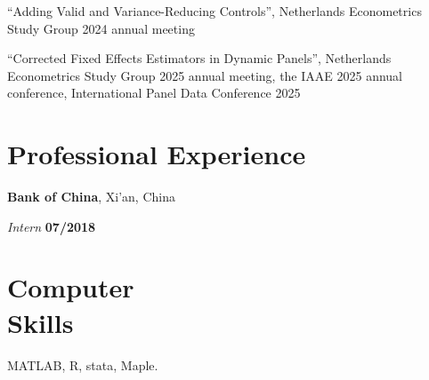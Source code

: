 \documentclass[margin,line]{res}
\newenvironment{list1}{
  \begin{list}{\ding{113}}{%
      \setlength{\itemsep}{0in}
      \setlength{\parsep}{0in} \setlength{\parskip}{0in}
      \setlength{\topsep}{0in} \setlength{\partopsep}{0in} 
      \setlength{\leftmargin}{0.17in}}}{\end{list}}
\begin{document}
\begin{resume}
``Adding Valid and Variance-Reducing Controls'', Netherlands Econometrics Study Group 2024 annual meeting
\vspace{-.3cm}

``Corrected Fixed Effects Estimators in Dynamic Panels'', Netherlands Econometrics Study Group 2025 annual meeting, the IAAE 2025 annual conference, International Panel Data Conference 2025 


\section{\sc Professional Experience}
{\bf Bank of China}, Xi'an, China

\vspace{-.3cm}
{\em Intern} \hfill {\bf 07/2018}\\

\section{\sc Computer \\ Skills}  MATLAB, R, stata, Maple.\\
%


\end{resume}
\end{document}
